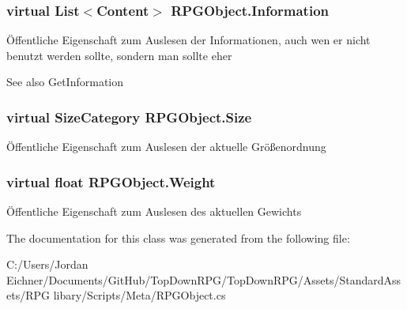 \subsubsection[{Information}]{\setlength{\rightskip}{0pt plus 5cm}virtual List$<${\bf Content}$>$ R\+P\+G\+Object.\+Information\hspace{0.3cm}{\ttfamily [get]}}\label{class_r_p_g_object_a312d68adaf6a8eb15319d3cac8198802}
Öffentliche Eigenschaft zum Auslesen der Informationen, auch wen er nicht benutzt werden sollte, sondern man sollte eher \begin{DoxySeeAlso}{See also}
Get\+Information 
\end{DoxySeeAlso}
\hypertarget{class_r_p_g_object_ad4fe72a3a4621618a563219805ede17d}{}
\subsubsection[{Size}]{\setlength{\rightskip}{0pt plus 5cm}virtual Size\+Category R\+P\+G\+Object.\+Size\hspace{0.3cm}{\ttfamily [get]}}\label{class_r_p_g_object_ad4fe72a3a4621618a563219805ede17d}
Öffentliche Eigenschaft zum Auslesen der aktuelle Größenordnung \hypertarget{class_r_p_g_object_af627383d88885ca597a549cb52e4b242}{}
\subsubsection[{Weight}]{\setlength{\rightskip}{0pt plus 5cm}virtual float R\+P\+G\+Object.\+Weight\hspace{0.3cm}{\ttfamily [get]}}\label{class_r_p_g_object_af627383d88885ca597a549cb52e4b242}
Öffentliche Eigenschaft zum Auslesen des aktuellen Gewichts 

The documentation for this class was generated from the following file\+:\begin{DoxyCompactItemize}
\item 
C\+:/\+Users/\+Jordan Eichner/\+Documents/\+Git\+Hub/\+Top\+Down\+R\+P\+G/\+Top\+Down\+R\+P\+G/\+Assets/\+Standard\+Assets/\+R\+P\+G libary/\+Scripts/\+Meta/R\+P\+G\+Object.\+cs\end{DoxyCompactItemize}
